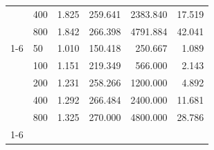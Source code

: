 \begin{table}
\begin{tabular}{llrrrr}
 & 400 & 1.825 & 259.641 & 2383.840 & 17.519 \\
 & 800 & 1.842 & 266.398 & 4791.884 & 42.041 \\
\cline{1-6}
\multirow[t]{5}{*}{Static} & 50 & 1.010 & 150.418 & 250.667 & 1.089 \\
 & 100 & 1.151 & 219.349 & 566.000 & 2.143 \\
 & 200 & 1.231 & 258.266 & 1200.000 & 4.892 \\
 & 400 & 1.292 & 266.484 & 2400.000 & 11.681 \\
 & 800 & 1.325 & 270.000 & 4800.000 & 28.786 \\
\cline{1-6}
\bottomrule
\end{tabular}
\end{table}
